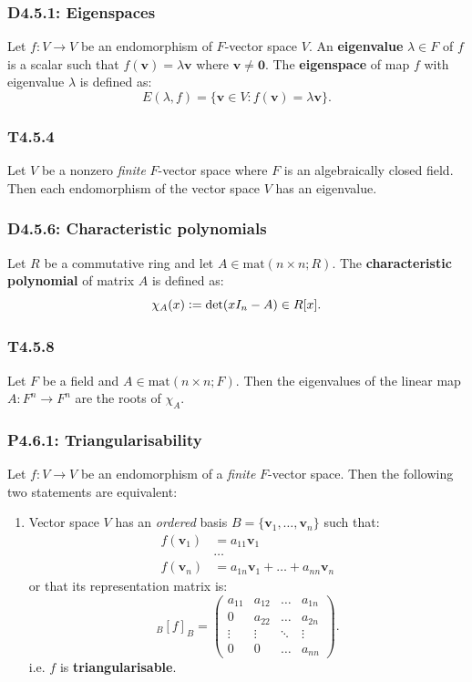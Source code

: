\documentclass{article}
\newcommand{\deq}{\vcentcolon=}
\newcommand{\vc}[1]{\boldsymbol{#1}}
\begin{document}
\begin{multicols*}{3}
\subsubsection*{D4.5.1: Eigenspaces}
Let $f:V\rightarrow V$ be an endomorphism of $F$-vector space $V$.
An \textbf{eigenvalue} $\lambda\in F$ of $f$ is a scalar such that
$f(\vc{v})=\lambda\vc{v}$ where $\vc{v}\neq\vc{0}$. The \textbf{eigenspace}
of map $f$ with eigenvalue $\lambda$ is defined as:
$$E(\lambda,f)=\{\vc{v}\in V:f(\vc{v})=\lambda\vc{v}\}.$$

\subsubsection*{T4.5.4}
Let $V$ be a nonzero \textit{finite} $F$-vector space 
where $F$ is an algebraically closed field. Then each
endomorphism of the vector space $V$ has an eigenvalue.

\subsubsection*{D4.5.6: Characteristic polynomials}
Let $R$ be a commutative ring and let $A\in\text{mat}(n\times n;R)$.
The \textbf{characteristic polynomial} of matrix $A$ is defined as:
$$\chi_A(x)\deq\det(xI_n-A)\in R[x].$$

\subsubsection*{T4.5.8}
Let $F$ be a field and $A\in\text{mat}(n\times n;F)$. Then the
eigenvalues of the linear map $A:F^n\rightarrow F^n$ are the
roots of $\chi_A$.

\subsubsection*{P4.6.1: Triangularisability}
Let $f:V\rightarrow V$ be an endomorphism of a \textit{finite} 
$F$-vector space. Then the following two statements are equivalent:
\begin{enumerate}
    \item Vector space $V$ has an \textit{ordered} basis
    $B=\{\vc{v}_1,\dots,\vc{v}_n\}$ such that:
    \begin{align*}
        f(\vc{v}_1) &=a_{11}\vc{v}_1 \\
        &\dots \\
        f(\vc{v}_n) &=a_{1n}\vc{v}_1+\dots+a_{nn}\vc{v}_n
    \end{align*}
    or that its representation matrix is:
    $${}_B[f]_B=\begin{pmatrix} a_{11} & a_{12} & \dots & a_{1n} \\
    0 & a_{22} & \dots & a_{2n} \\ \vdots & \vdots & \ddots & \vdots \\
    0 & 0 & \dots & a_{nn}\end{pmatrix}.$$
    i.e. $f$ is \textbf{triangularisable}.


\end{enumerate}
\end{multicols*}
\end{document}
